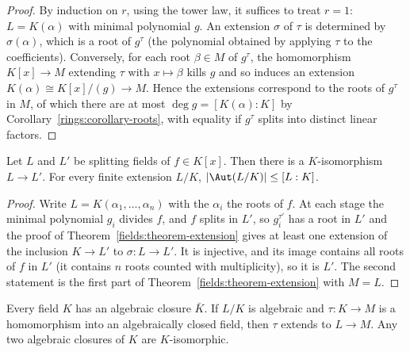 \begin{proof}
By induction on $r$, using the tower law, it suffices to treat $r = 1$: $L = K(\alpha)$ with
minimal polynomial $g$. An extension $\sigma$ of $\tau$ is determined by $\sigma(\alpha)$, which is a
root of $g^\tau$ (the polynomial obtained by applying $\tau$ to the coefficients).
Conversely, for each root $\beta \in M$ of $g^\tau$, the homomorphism
$K[x] \to M$ extending $\tau$ with $x \mapsto \beta$ kills $g$ and so induces an extension
$K(\alpha) \cong K[x]/(g) \to M$. Hence the extensions correspond to the roots of $g^\tau$ in $M$,
of which there are at most $\deg g = [K(\alpha) : K]$ by Corollary~\ref{rings:corollary-roots},
with equality if $g^\tau$ splits into distinct linear factors.
\end{proof}

\begin{corollary}\label{fields:corollary-splitting-unique}
Let $L$ and $L'$ be splitting fields of $f \in K[x]$. Then there is a $K$-isomorphism
$L \to L'$. For every finite extension $L/K$, $|\Aut(L/K)| \leq [L : K]$.
\end{corollary}

\begin{proof}
Write $L = K(\alpha_1, \ldots, \alpha_n)$ with the $\alpha_i$ the roots of $f$. At each stage the
minimal polynomial $g_i$ divides $f$, and $f$ splits in $L'$, so $g_i^{\tau'}$ has a root in $L'$
and the proof of Theorem~\ref{fields:theorem-extension} gives at least one extension of
the inclusion $K \to L'$ to $\sigma \colon L \to L'$. It is injective, and its image contains all
roots of $f$ in $L'$ (it contains $n$ roots counted with multiplicity), so it is $L'$. The
second statement is the first part of Theorem~\ref{fields:theorem-extension} with
$M = L$.
\end{proof}

\begin{theorem}\label{fields:theorem-algebraic-closure}
Every field $K$ has an algebraic closure $\bar K$. If $L/K$ is algebraic and $\tau \colon K \to M$ is
a homomorphism into an algebraically closed field, then $\tau$ extends to $L \to M$. Any two
algebraic closures of $K$ are $K$-isomorphic.
\end{theorem}

